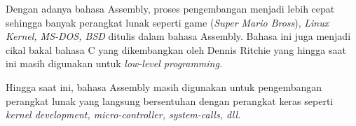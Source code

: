 \documentclass{article}
\begin{document}
    Dengan adanya bahasa Assembly, proses pengembangan menjadi lebih cepat
    sehingga banyak perangkat lunak seperti game (\textit{Super Mario Bross}),
    \textit{Linux Kernel, MS-DOS, BSD} ditulis dalam bahasa Assembly.
    Bahasa ini juga menjadi cikal bakal bahasa C yang dikembangkan oleh
    Dennis Ritchie yang hingga saat ini masih digunakan untuk \textit{low-level
    programming.} 

    Hingga saat ini, bahasa Assembly masih digunakan untuk pengembangan perangkat
    lunak yang langsung bersentuhan dengan perangkat keras seperti \textit{kernel development,
    micro-controller, system-calls, dll.}

    
\end{document}
